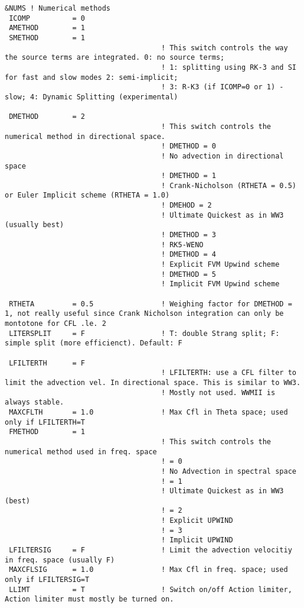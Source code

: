 \documentclass[12pt]{amsart}
\begin{document}
\begin{verbatim}
&NUMS ! Numerical methods
 ICOMP          = 0
 AMETHOD        = 1
 SMETHOD        = 1
                                     ! This switch controls the way the source terms are integrated. 0: no source terms;
                                     ! 1: splitting using RK-3 and SI for fast and slow modes 2: semi-implicit;
                                     ! 3: R-K3 (if ICOMP=0 or 1) - slow; 4: Dynamic Splitting (experimental)

 DMETHOD        = 2
                                     ! This switch controls the numerical method in directional space.
                                     ! DMETHOD = 0
                                     ! No advection in directional space
                                     ! DMETHOD = 1
                                     ! Crank-Nicholson (RTHETA = 0.5) or Euler Implicit scheme (RTHETA = 1.0)
                                     ! DMEHOD = 2
                                     ! Ultimate Quickest as in WW3 (usually best)
                                     ! DMETHOD = 3
                                     ! RK5-WENO
                                     ! DMETHOD = 4
                                     ! Explicit FVM Upwind scheme
                                     ! DMETHOD = 5
                                     ! Implicit FVM Upwind scheme

 RTHETA         = 0.5                ! Weighing factor for DMETHOD = 1, not really useful since Crank Nicholson integration can only be montotone for CFL .le. 2
 LITERSPLIT     = F                  ! T: double Strang split; F: simple split (more efficienct). Default: F

 LFILTERTH      = F
                                     ! LFILTERTH: use a CFL filter to limit the advection vel. In directional space. This is similar to WW3.
                                     ! Mostly not used. WWMII is always stable.
 MAXCFLTH       = 1.0                ! Max Cfl in Theta space; used only if LFILTERTH=T
 FMETHOD        = 1
                                     ! This switch controls the numerical method used in freq. space
                                     ! = 0
                                     ! No Advection in spectral space
                                     ! = 1
                                     ! Ultimate Quickest as in WW3 (best)
                                     ! = 2
                                     ! Explicit UPWIND 
                                     ! = 3
                                     ! Implicit UPWIND
 LFILTERSIG     = F                  ! Limit the advection velocitiy in freq. space (usually F)
 MAXCFLSIG      = 1.0                ! Max Cfl in freq. space; used only if LFILTERSIG=T
 LLIMT          = T                  ! Switch on/off Action limiter, Action limiter must mostly be turned on.


\end{verbatim}
\end{document}
